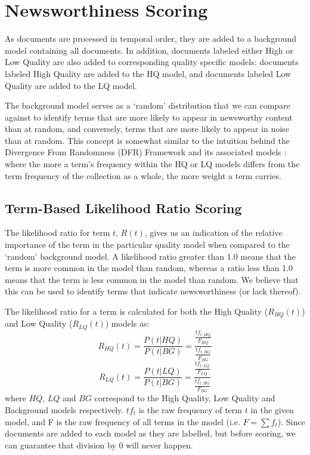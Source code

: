 
\section{Newsworthiness Scoring}
\label{scoring:sec:scoring}

As documents are processed in temporal order, they are added to a background model containing all documents.
In addition, documents labeled either High or Low Quality are also added to corresponding quality specific models: documents labeled High Quality are added to the HQ model, and documents labeled Low Quality are added to the LQ model.

The background model serves as a `random' distribution that we can compare against to identify terms that are more likely to appear in newsworthy content than at random, and conversely, terms that are more likely to appear in noise than at random.
This concept is somewhat similar to the intuition behind the Divergence From Randomness (DFR) Framework and its associated models \citep{Amati02}: where the more a term's frequency within the HQ or LQ models differs from the term frequency of the collection as a whole, the more weight a term carries.

\subsection{Term-Based Likelihood Ratio Scoring}
\label{sec:scoring:likelihoodRatio}
The likelihood ratio for term \(t\), \(R(t)\), gives us an indication of the relative importance of the term in the particular quality model when compared to the `random' background model.
A likelihood ratio greater than 1.0 means that the term is more common in the model than random, whereas a ratio less than 1.0 means that the term is less common in the model than random.
We believe that this can be used to identify terms that indicate newsworthiness (or lack thereof).

The likelihood ratio for a term is calculated for both the High Quality (\(R_{HQ}(t)\)) and Low Quality (\(R_{LQ}(t)\)) models as:
\begin{equation}
	R_{HQ}(t) =
	\frac{
		P(t|HQ)
	}{
		P(t|BG)
	} =
	\frac{
		\frac{tf_{t,HQ}}{F_{HQ}}
	}{
		\frac{tf_{t,BG}}{F_{BG}}
	}
\end{equation}
\begin{equation}
	R_{LQ}(t) =
	\frac{
		P(t|LQ)
	}{
		P(t|BG)
	} =
	\frac{
		\frac{tf_{t,LQ}}{F_{LQ}}
	}{
		\frac{tf_{t,BG}}{F_{BG}}
	}
\end{equation}
where \(HQ\), \(LQ\) and \(BG\) correspond to the High Quality, Low Quality and Background models respectively. \(tf_t\) is the raw frequency of term  \(t\) in the given model, and F is the raw frequency of all terms in the model (i.e.  \(F = \sum{f_t}\)). Since documents are added to each model as they are labelled, but before scoring, we can guarantee that division by 0 will never happen.

